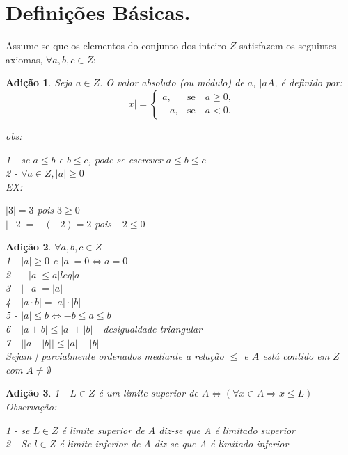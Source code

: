\documentclass[a4paper,12pt]{article}
\newtheorem{add}{Adição}
\begin{document}
\section{Definições Básicas.}

Assume-se que os elementos do conjunto dos inteiro $Z$ satisfazem os seguintes axiomas, $\forall a, b, c \in Z$:

\begin{add} %
  Seja $a \in Z$. O valor absoluto (ou módulo) de $a$, $|aA$, é definido por:\\
  $$
  |x|=\left\{
    \begin{array}{rc}
      a,&\mbox{se}\quad a\ge 0,\\
      -a, &\mbox{se}\quad a<0.
    \end{array}\right.
  $$

obs:

1 - se $a \leq b$ e $b \leq c$, pode-se escrever $a \leq b \leq c$\\
2 - $\forall a \in Z, |a| \ge 0$\\

EX:

$|3| = 3$ pois $3 \geq 0$\\
$|-2| = -(-2) = 2$ pois $-2 \leq 0$
\end{add}

\begin{add} %
  $\forall a, b,c \in Z$\\

  1 - $|a| \ge 0 $ e $|a| = 0 \iff a = 0$\\
  2 - $-|a| \leq a |leq |a|$\\
  3 - $|-a| = |a|$\\
  4 - $|a \cdot b| = |a|\cdot|b|$\\
  5 - $|a| \leq b  \iff -b \leq a \leq b$\\
  6 - $|a + b| \leq |a| + |b|$ - desigualdade triangular\\
  7 - $ ||a| - |b|| \leq |a| - |b|$\\

  Sejam | parcialmente ordenados mediante a relação $\leq$ e $A $ está contido em $Z$ com $A \neq \emptyset$
\end{add}

\begin{add} %
  1 - $L \in Z$ é  um limite superior de $A  \iff (\forall x \in A \Longrightarrow x \leq L) $\\

Observação:

1 - se $L \in Z$ é limite superior de A diz-se que A é limitado superior\\
2 - Se $l \in Z$ é limite inferior de A diz-se que A é limitado inferior\\
\end{add}
\end{document}
